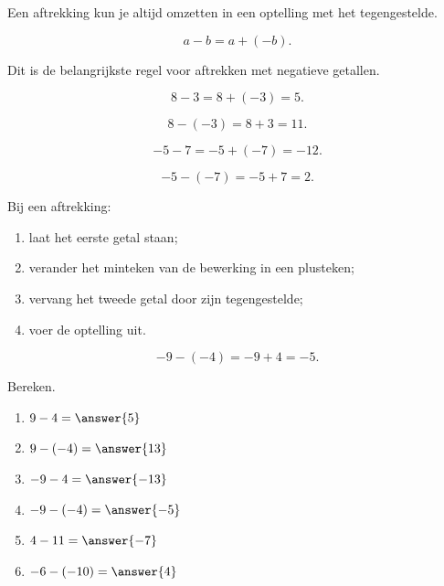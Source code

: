 \documentclass{ximera}
\begin{document}

Een aftrekking kun je altijd omzetten in een optelling met het tegengestelde.

\[
a-b=a+(-b).
\]

Dit is de belangrijkste regel voor aftrekken met negatieve getallen.

\begin{example}
\[
8-3=8+(-3)=5.
\]
\end{example}

\begin{example}
\[
8-(-3)=8+3=11.
\]
\end{example}

\begin{example}
\[
-5-7=-5+(-7)=-12.
\]
\end{example}

\begin{example}
\[
-5-(-7)=-5+7=2.
\]
\end{example}


Bij een aftrekking:

\begin{enumerate}
    \item laat het eerste getal staan;
    \item verander het minteken van de bewerking in een plusteken;
    \item vervang het tweede getal door zijn tegengestelde;
    \item voer de optelling uit.
\end{enumerate}

\[
-9-(-4)
=
-9+4
=
-5.
\]

\begin{exercise}
Bereken.

\begin{enumerate}
    \item $9-4=\answer{5}$
    \item $9-(-4)=\answer{13}$
    \item $-9-4=\answer{-13}$
    \item $-9-(-4)=\answer{-5}$
    \item $4-11=\answer{-7}$
    \item $-6-(-10)=\answer{4}$
\end{enumerate}
\end{exercise}
\end{document}
